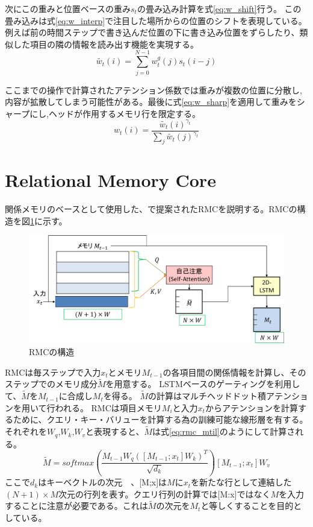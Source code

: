 次にこの重みと位置ベースの重み$s_t$の畳み込み計算を式\ref{eq:w_shift}行う。
この畳み込みは式\ref{eq:w_interp}で注目した場所からの位置のシフトを表現している。
例えば前の時間ステップで書き込んだ位置の下に書き込み位置をずらしたり、類似した項目の隣の情報を読み出す機能を実現する。
\begin{equation} \label{eq:w_shift}
	\tilde{w_t}(i) = \sum_{j=0}^{N-1}w^g_t(j)s_t(i-j)
\end{equation}

ここまでの操作で計算されたアテンション係数では重みが複数の位置に分散し,内容が拡散してしまう可能性がある。最後に式\ref{eq:w_sharp}を適用して重みをシャープにし,ヘッドが作用するメモリ行を限定する。
\begin{equation} \label{eq:w_sharp}
	w_t(i) = \frac{\tilde{w_t}(i)^{\gamma_t}}{\sum_j\tilde{w_t}(j)^{\gamma_t}}
\end{equation}

\section{Relational Memory Core}
関係メモリのベースとして使用した、\cite{rrnn}で提案されたRMCを説明する。RMCの構造を図\ref{fig:rmc}に示す。

\begin{figure}[t]
	\centering
	\includegraphics[width=\linewidth]{./figure/img_slide/rmc.png}
	\caption{RMCの構造}
	\label{fig:rmc}
\end{figure}

RMCは毎ステップで入力$x_t$とメモリ$M_{t-1}$の各項目間の関係情報を計算し、そのステップでのメモリ成分$\tilde{M}$を用意する。
LSTMベースのゲーティングを利用して、$\tilde{M}$を$M_{t-1}$に合成し$M_t$を得る。
$\tilde{M}$の計算はマルチヘッドドット積アテンション\cite{transformer}を用いて行われる。
RMCは項目メモリ$M_i$と入力$x_t$からアテンションを計算するために、クエリ・キー・バリューを計算する為の訓練可能な線形層を有する。
それぞれを$W_q$,$W_k$,$W_v$と表現すると、$\tilde{M}$は式\ref{eq:rmc_mtil}のようにして計算される。
\begin{equation} \label{eq:rmc_mtil}
	\tilde{M} =softmax ( \frac{M_{t-1}W_q ([M_{t-1};x_t]W_k)^T}{ \sqrt{d_k}} ) [M_{t-1};x_t]W_v
\end{equation}
ここで$d_k$はキーベクトルの次元　、[M;x]は$M$に$x_t$を新たな行として連結した$(N+1)\times M$次元の行列を表す。クエリ行列の計算では[M:x]ではなく$M$を入力することに注意が必要である。これは$\tilde{M}$の次元を$M_t$と等しくすることを目的としている。

